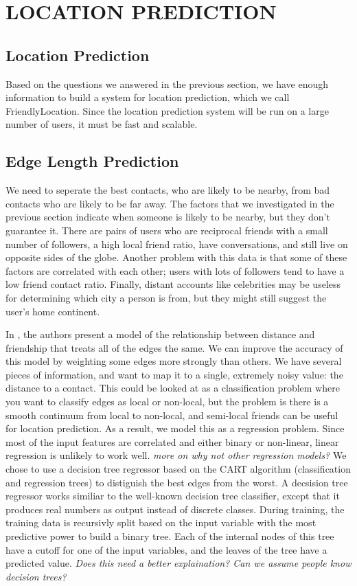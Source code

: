 \ifdefined\THESIS
    \chapter{\uppercase{Location Prediction}}
\else
    \section{Location Prediction}
\fi

Based on the questions we answered in the previous section, we have enough
information to build a system for location prediction, which we call
FriendlyLocation.
Since the location prediction system will be run on a large number of users,
it must be fast and scalable.

\section{Edge Length Prediction}

We need to seperate the best contacts, who are likely to be nearby, from
bad contacts who are likely to be far away.
%
The factors that we investigated in the previous section indicate when someone
is likely to be nearby, but they don't guarantee it.
%
There are pairs of users who are reciprocal friends with a small number of
followers, a high local friend ratio, have conversations, and still live on
opposite sides of the globe.
%
Another problem with this data is that some of these factors are correlated
with each other; users with lots of followers tend to have a low friend contact
ratio.
%
Finally, distant accounts like celebrities may be useless for determining which
city a person is from, but they might still suggest the user's home continent.

In \cite{backstrom2010find}, the authors present a model of the relationship
between distance and friendship that treats all of the edges the same.
%
We can improve the accuracy of this model by weighting some edges more strongly
than others.
%
We have several pieces of information, and want to map it to a single, extremely
noisy value: the distance to a contact.
%
This could be looked at as a classification problem where you want to classify
edges as local or non-local, but the problem is there is a smooth continuum
from local to non-local, and semi-local friends can be useful for location
prediction.
%
As a result, we model this as a regression problem.
%
Since most of the input features are correlated and either binary or non-linear,
linear regression is unlikely to work well.
%
\emph{more on why not other regression models?}
%
We chose to use a decision tree regressor based on the CART algorithm
(classification and regression trees) to distiguish the best edges from the
worst.
%
A decsision tree regressor works similiar to the well-known decision tree
classifier, except that it produces real numbers as output instead of discrete
classes.
%
During training, the training data is recursivly split based on the input
variable with the most predictive power to build a binary tree.
%
Each of the internal nodes of this tree have a cutoff for one of the input
variables, and the leaves of the tree have a predicted value.
%
\emph{Does this need a better explaination? Can we assume people know decision
trees?}

